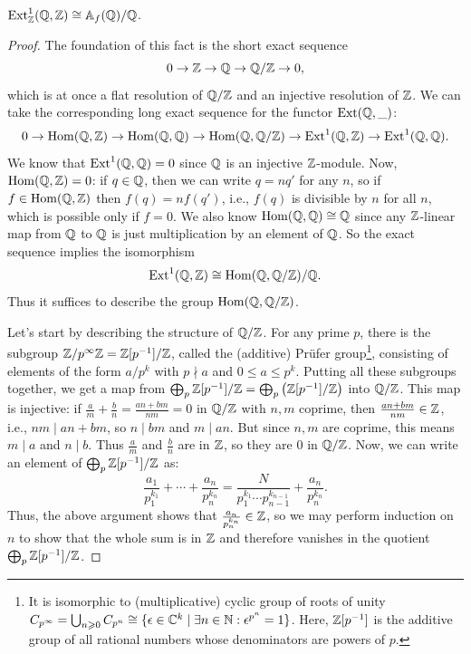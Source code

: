 \begin{thm}
    $\operatorname{Ext}_{\mathbb{Z}}^1(\mathbb{Q},\mathbb{Z})\cong \mathbb{A}_f(\mathbb{Q})\slash\mathbb{Q}$.
\end{thm}
\begin{proof}
    The foundation of this fact is the short exact sequence
    \[0\to \mathbb{Z}\to \mathbb{Q}\to \mathbb{Q}\slash\mathbb{Z}\to 0,\]
    which is at once a flat resolution of $\mathbb{Q}\slash\mathbb{Z}$ and an injective resolution of $\mathbb{Z}$. We can take the corresponding long exact sequence for the functor $\operatorname{Ext}(\mathbb{Q},\_)$:
    \[0\to \operatorname{Hom}(\mathbb{Q},\mathbb{Z})\to \operatorname{Hom}(\mathbb{Q},\mathbb{Q})\to \operatorname{Hom}(\mathbb{Q},\mathbb{Q}\slash \mathbb{Z})\to \operatorname{Ext}^1(\mathbb{Q},\mathbb{Z})\to \operatorname{Ext}^1(\mathbb{Q},\mathbb{Q}).\]
    We know that $\operatorname{Ext}^1(\mathbb{Q},\mathbb{Q})=0$ since $\mathbb{Q}$ is an injective $\mathbb{Z}$-module. Now, $\operatorname{Hom}(\mathbb{Q},\mathbb{Z})=0$: if $q\in \mathbb{Q}$, then we can write $q=nq'$ for any $n$, so if $f\in\operatorname{Hom}(\mathbb{Q},\mathbb{Z})$ then $f(q)=nf(q')$, i.e., $f(q)$ is divisible by $n$ for all $n$, which is possible only if $f=0$. We also know $\operatorname{Hom}(\mathbb{Q},\mathbb{Q})\cong\mathbb{Q}$ since any $\mathbb{Z}$-linear map from $\mathbb{Q}$ to $\mathbb{Q}$ is just multiplication by an element of $\mathbb{Q}$. So the exact sequence implies the isomorphism
    \[\operatorname{Ext}^1(\mathbb{Q},\mathbb{Z})\cong \operatorname{Hom}(\mathbb{Q},\mathbb{Q}\slash \mathbb{Z})\slash \mathbb{Q}.\]
    Thus it suffices to describe the group $\operatorname{Hom}(\mathbb{Q},\mathbb{Q}\slash \mathbb{Z})$.

    Let's start by describing the structure of $\mathbb{Q}\slash\mathbb{Z}$. For any prime $p$, there is the subgroup $\mathbb{Z}\slash p^\infty\mathbb{Z}=\mathbb{Z}[p^{-1}]\slash\mathbb{Z}$, called the (additive) Pr\"ufer group\footnote{It is isomorphic to (multiplicative) cyclic group of roots of unity $C_{p^\infty}=\bigcup_{n\geqslant 0}C_{p^n}\cong\{\epsilon\in\mathbb{C}^k\mid \exists n\in\mathbb{N}: \epsilon^{p^n}=1\}$. Here, $\mathbb{Z}[p^{-1}]$ is the additive group of all rational numbers whose denominators are powers of $p$.}, consisting of elements of the form $a/p^k$ with $p\nmid a$ and $0\leq a\leq p^k$. Putting all these subgroups together, we get a map from $\bigoplus_p\mathbb{Z}[p^{-1}]\slash\mathbb{Z}=\bigoplus_p\left(\mathbb{Z}[p^{-1}]\slash\mathbb{Z}\right)$ into $\mathbb{Q}\slash\mathbb{Z}$. This map is injective: if $\frac am+\frac bn=\frac{an+bm}{nm}=0$ in $\mathbb{Q}\slash\mathbb{Z}$ with $n,m$ coprime, then $\frac{an+bm}{nm}\in\mathbb{Z}$, i.e., $nm\mid an+bm$, so $n\mid bm$ and $m\mid an$. But since $n,m$ are coprime, this means $m\mid a$ and $n\mid b$. Thus $\frac am$ and $\frac bn$ are in $\mathbb{Z}$, so they are $0$ in $\mathbb{Q}\slash\mathbb{Z}$. Now, we can write an element of $\bigoplus_p\mathbb{Z}[p^{-1}]\slash\mathbb{Z}$ as:
    \[\frac{a_1}{p_1^{k_1}}+\cdots +\frac{a_n}{p_n^{k_n}}=\frac{N}{p_1^{k_1}\cdots p_{n-1}^{k_{n-1}}}+\frac{a_n}{p_n^{k_n}}.\]
    Thus, the above argument shows that $\frac{a_n}{p_n^{k_n}}\in\mathbb{Z}$, so we may perform induction on $n$ to show that the whole sum is in $\mathbb{Z}$ and therefore vanishes in the quotient $\bigoplus_p\mathbb{Z}[p^{-1}]\slash\mathbb{Z}$.


\end{proof}
